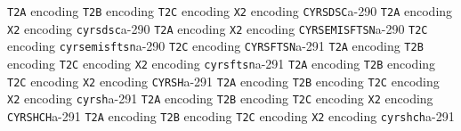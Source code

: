 \documentclass[twoside]{ltxdoc}
\makeatletter
\renewenvironment{theindex}{%
   \@restonecoltrue
   \if@twocolumn\@restonecolfalse\fi
   \columnseprule \z@
   \columnsep 35\p@
   \twocolumn[\index@prologue]%
   \IndexParms
   \let\item\@idxitem
   \ignorespaces
}{\if@restonecol\onecolumn\else\clearpage\fi}
\makeatother
\begin{document}
\begin{theindex}
    \subitem \texttt  {T2A} encoding\pfill {}
    \subitem \texttt  {T2B} encoding\pfill {}
    \subitem \texttt  {T2C} encoding\pfill {}
    \subitem \texttt  {X2} encoding\pfill {}
  \item \texttt  {CYRSDSC}\pfill a-290
    \subitem \texttt  {T2A} encoding\pfill {}
    \subitem \texttt  {X2} encoding\pfill {}
  \item \texttt  {cyrsdsc}\pfill a-290
    \subitem \texttt  {T2A} encoding\pfill {}
    \subitem \texttt  {X2} encoding\pfill {}
  \item \texttt  {CYRSEMISFTSN}\pfill a-290
    \subitem \texttt  {T2C} encoding\pfill {}
  \item \texttt  {cyrsemisftsn}\pfill a-290
    \subitem \texttt  {T2C} encoding\pfill {}
  \item \texttt  {CYRSFTSN}\pfill a-291
    \subitem \texttt  {T2A} encoding\pfill {}
    \subitem \texttt  {T2B} encoding\pfill {}
    \subitem \texttt  {T2C} encoding\pfill {}
    \subitem \texttt  {X2} encoding\pfill {}
  \item \texttt  {cyrsftsn}\pfill a-291
    \subitem \texttt  {T2A} encoding\pfill {}
    \subitem \texttt  {T2B} encoding\pfill {}
    \subitem \texttt  {T2C} encoding\pfill {}
    \subitem \texttt  {X2} encoding\pfill {}
  \item \texttt  {CYRSH}\pfill a-291
    \subitem \texttt  {T2A} encoding\pfill {}
    \subitem \texttt  {T2B} encoding\pfill {}
    \subitem \texttt  {T2C} encoding\pfill {}
    \subitem \texttt  {X2} encoding\pfill {}
  \item \texttt  {cyrsh}\pfill a-291
    \subitem \texttt  {T2A} encoding\pfill {}
    \subitem \texttt  {T2B} encoding\pfill {}
    \subitem \texttt  {T2C} encoding\pfill {}
    \subitem \texttt  {X2} encoding\pfill {}
  \item \texttt  {CYRSHCH}\pfill a-291
    \subitem \texttt  {T2A} encoding\pfill {}
    \subitem \texttt  {T2B} encoding\pfill {}
    \subitem \texttt  {T2C} encoding\pfill {}
    \subitem \texttt  {X2} encoding\pfill {}
  \item \texttt  {cyrshch}\pfill a-291

\end{theindex}
\end{document}
